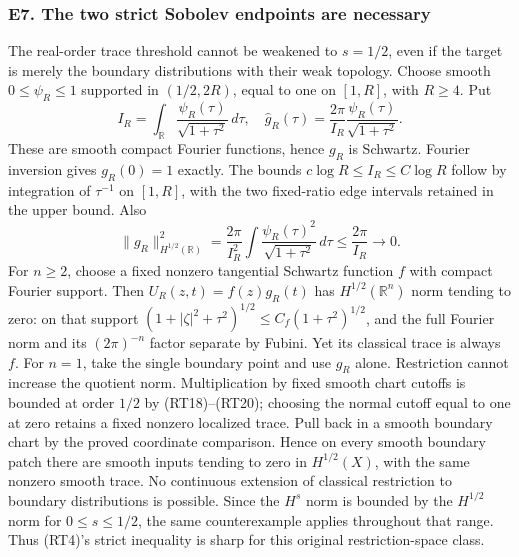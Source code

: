\documentclass[
  11pt,
]{article}
\makeatletter
\let\ReaderOriginalAnchorStart\hyper@anchorstart
\let\ReaderOriginalAnchorEnd\hyper@anchorend
\let\ReaderPendingAliases\@empty
\def\ReaderArmAliases#1{\gdef\ReaderPendingAliases{#1}}
\def\hyper@anchorstart#1{\ReaderIfNativeAnchorTF{#1}{\ReaderPendingAliases\global\let\ReaderPendingAliases\@empty}{}\ReaderOriginalAnchorStart{#1}}
\makeatother
\begin{document}
\ReaderArmAliases{\ReaderOriginalAnchorStart{e7.-the-two-strict-sobolev-endpoints-are-necessary}\ReaderOriginalAnchorEnd}
\subsubsection{E7. The two strict Sobolev endpoints are
necessary}\label{e7.-the-two-strict-sobolev-endpoints-are-necessary}

The real-order trace threshold cannot be weakened to \(s=1/2\), even if
the target is merely the boundary distributions with their weak
topology. Choose smooth \(0\leq\psi_R\leq1\) supported in \((1/2,2R)\),
equal to one on \([1,R]\), with \(R\geq4\). Put \[
 I_R=\int_{\mathbb R}\frac{\psi_R(\tau)}{\sqrt{1+\tau^2}}\,d\tau,
 \quad
 \widehat g_R(\tau)=\frac{2\pi}{I_R}
                         \frac{\psi_R(\tau)}{\sqrt{1+\tau^2}}.
 \tag{DSP-E24}
\] These are smooth compact Fourier functions, hence \(g_R\) is
Schwartz. Fourier inversion gives \(g_R(0)=1\) exactly. The bounds
\(c\log R\leq I_R\leq C\log R\) follow by integration of \(\tau^{-1}\)
on \([1,R]\), with the two fixed-ratio edge intervals retained in the
upper bound. Also \[
 \|g_R\|_{H^{1/2}(\mathbb R)}^2
 =\frac{2\pi}{I_R^2}\int
             \frac{\psi_R(\tau)^2}{\sqrt{1+\tau^2}}\,d\tau
 \leq\frac{2\pi}{I_R}\longrightarrow0.
 \tag{DSP-E25}
\] For \(n\geq2\), choose a fixed nonzero tangential Schwartz function
\(f\) with compact Fourier support. Then \(U_R(z,t)=f(z)g_R(t)\) has
\(H^{1/2}(\mathbb R^n)\) norm tending to zero: on that support
\((1+|\zeta|^2+\tau^2)^{1/2}\leq C_f(1+\tau^2)^{1/2}\), and the full
Fourier norm and its \((2\pi)^{-n}\) factor separate by Fubini. Yet its
classical trace is always \(f\). For \(n=1\), take the single boundary
point and use \(g_R\) alone. Restriction cannot increase the quotient
norm. Multiplication by fixed smooth chart cutoffs is bounded at order
\(1/2\) by (RT18)--(RT20); choosing the normal cutoff equal to one at
zero retains a fixed nonzero localized trace. Pull back in a smooth
boundary chart by the proved coordinate comparison. Hence on every
smooth boundary patch there are smooth inputs tending to zero in
\(H^{1/2}(X)\), with the same nonzero smooth trace. No continuous
extension of classical restriction to boundary distributions is
possible. Since the \(H^s\) norm is bounded by the \(H^{1/2}\) norm for
\(0\leq s\leq1/2\), the same counterexample applies throughout that
range. Thus (RT4)'s strict inequality is sharp for this original
restriction-space class.
\end{document}

